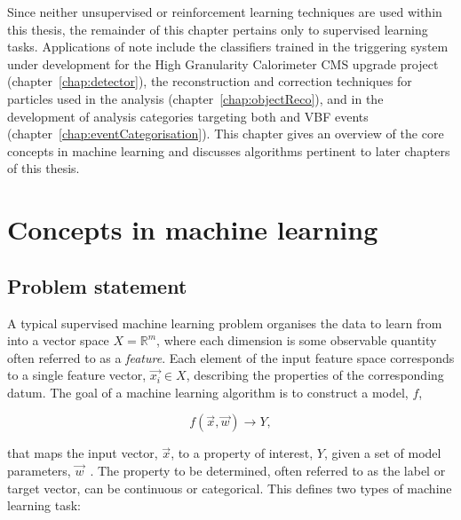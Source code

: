 Since neither unsupervised or reinforcement learning techniques are used within this thesis, the remainder of this chapter pertains only to supervised learning tasks. Applications of note include the classifiers trained in the triggering system under development for the High Granularity Calorimeter CMS upgrade project (chapter~\ref{chap:detector}), the reconstruction and correction techniques for particles used in the \Hee analysis (chapter~\ref{chap:objectReco}), and in the development of analysis categories targeting both \ggH and VBF \Hee events (chapter~\ref{chap:eventCategorisation}). This chapter gives an overview of the core concepts in machine learning and discusses algorithms pertinent to later chapters of this thesis. 

\section{Concepts in machine learning}

\subsection{Problem statement}

A typical supervised machine learning problem organises the data to learn from into a vector space $X=\mathbb{R}^{m}$, where each dimension is some observable quantity often referred to as a \textit{feature}. Each element of the input feature space corresponds to a single feature vector, $\vec{x_{i}}\in X$, describing the properties of the corresponding datum. The goal of a machine learning algorithm is to construct a model, $f$, %

$$f(\vec{x},\vec{w})\rightarrow Y,$$

\noindent that maps the input vector, $\vec{x}$, to a property of interest, $Y$, given a set of model parameters, $\vec{w}$~\cite{statistical_learning}. The property to be determined, often referred to as the label or target vector, can be continuous or categorical. This defines two types of machine learning task:

